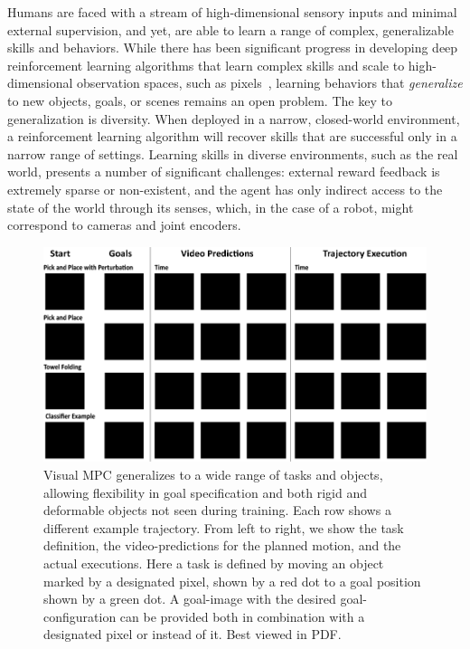 
Humans are faced with a stream of high-dimensional sensory inputs and minimal external supervision, and yet, are able to learn a range of complex, generalizable skills and behaviors.
While there has been significant progress in developing deep reinforcement learning algorithms that learn complex skills and scale to high-dimensional observation spaces, such as pixels~\cite{tdgammon,atari,e2e,alphago}, learning behaviors that \emph{generalize} to new objects, goals, or scenes remains an open problem.
The key to generalization is diversity. When deployed in a narrow, closed-world environment, a reinforcement learning algorithm will recover skills that are successful only in a narrow range of settings. 
Learning skills in diverse  environments, such as the real world, presents a number of significant challenges: external reward feedback is extremely sparse or non-existent, and the agent has only indirect access to the state of the world through its senses, which, in the case of a robot, might correspond to cameras and joint encoders.
\begin{figure}[t]
	\centering
	\includegraphics[width=1\columnwidth,trim={0mm 0 0 0},clip]{images_general/tile_rough.png}
	\caption{Visual MPC generalizes to a wide range of tasks and objects, allowing flexibility in goal specification and both rigid and deformable objects not seen during training. Each row shows a different example trajectory. From left to right, we show the task definition, the video-predictions for the planned motion, and the actual executions. Here a task is defined by moving an object marked by a designated pixel, shown by a red dot to a goal position shown by a green dot. A goal-image with the desired goal-configuration can be provided both in combination with a designated pixel or instead of it. Best viewed in PDF.}
	\label{fig:example_traj}
\end{figure}
